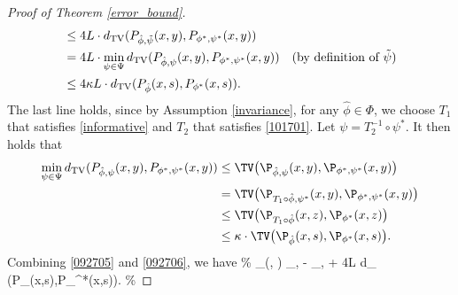 \begin{proof}[Proof of Theorem  \ref{error_bound}]
\begin{align}
&\leq 4L \cdot d_\mathrm{TV} (P_{\hat{\phi},\tilde{\psi}}(x,y),P_{\phi^{*},\psi^{*}}(x,y)) \notag \\
&= 4L \cdot \min_{\psi \in \Psi} d_\mathrm{TV} (P_{\hat{\phi},\psi}(x,y),P_{\phi^{*},\psi^{*}}(x,y)) \quad (\text{by definition of } \tilde{\psi}) \notag \\
& \leq 4\kappa L  \cdot d_\mathrm{TV} (P_{\hat{\phi}}(x,s),P_{\phi^{*}}(x,s)).
\end{align}
The last line holds, since by Assumption \ref{invariance}, for any $\hat{\phi} \in\Phi$, we choose $T_1$ that satisfies \eqref{informative} and $T_2$ that satisfies \eqref{101701}. Let $\psi=T^{-1}_2\circ\psi^* $. It then holds that
\begin{align}
 \min_{\psi \in \Psi} d_\mathrm{TV} (P_{\hat{\phi},\psi}(x,y),P_{\phi^{*},\psi^{*}}(x,y)) &\leq 
\TV\big(\P_{\hat{\phi},\psi}(x,y),\P_{\phi^* ,\psi^* }(x,y)\big) \notag \\
&=\TV\big(\P_{T_1\circ\hat{\phi},\psi^* }(x,y),\P_{\phi^* ,\psi^* }(x,y)\big) \notag \\
&\leq\TV\big(\P_{T_1\circ\hat{\phi}}(x,z),\P_{\phi^* }(x,z)\big) \notag \\
&\leq \kappa \cdot\TV\big(\P_{\hat{\phi}}(x,s),\P_{\phi^* }(x,s)\big).
\end{align}
Combining \eqref{092705} and \eqref{092706}, we have
\% \label{decomposition}
_{\ell}(\hat{\phi}, \hat{\psi}) \leq \Delta_{\hat{\phi}, \hat{\psi}} - \Delta_{\hat{\phi}, \tilde{\psi}} + 4\kappa L  \cdot d_ (P_{\hat{\phi}}(x,s),P_{\phi^{*}}(x,s)).
\%


\end{proof}
